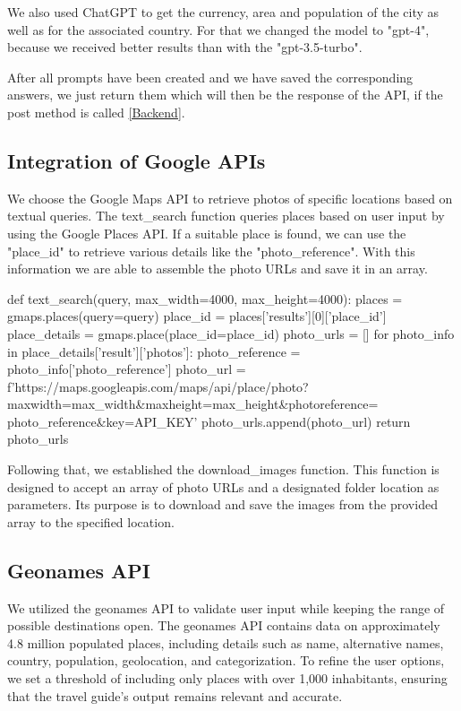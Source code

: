 \documentclass[english,notitlepage,smartquotes]{hgbreport}
\begin{document}
We also used ChatGPT to get the currency, area and population of the city as well as for the associated country. For that we changed the model to "gpt-4", because we received better results than with the "gpt-3.5-turbo".

After all prompts have been created and we have saved the corresponding answers, we just return them which will then be the response of the API, if the post method is called \ref{Backend}.

\subsection{Integration of Google APIs}
We choose the Google Maps API to retrieve photos of specific locations based on textual queries. The text\_search function queries places based on user input by using the Google Places API. If a suitable place is found, we can use the "place\_id" to retrieve various details like the "photo\_reference". With this information we are able to assemble the photo URLs and save it in an array.
\begin{PythonCode}
	def text_search(query, max_width=4000, max_height=4000):
	places = gmaps.places(query=query)
	place_id = places['results'][0]['place_id']
	place_details = gmaps.place(place_id=place_id)
	photo_urls = []
	for photo_info in place_details['result']['photos']:
	photo_reference = photo_info['photo_reference']
	photo_url = f'https://maps.googleapis.com/maps/api/place/photo?
	maxwidth={max_width}&maxheight={max_height}&photoreference={
		photo_reference}&key={API_KEY}'
	photo_urls.append(photo_url)
	return photo_urls
\end{PythonCode}
Following that, we established the download\_images function. This function is designed to accept an array of photo URLs and a designated folder location as parameters. Its purpose is to download and save the images from the provided array to the specified location.

\subsection{Geonames API} \label{GeonamesAPI}
We utilized the geonames API to validate user input while keeping the range of possible destinations open. The geonames API contains data on approximately 4.8 million populated places, including details such as name, alternative names, country, population, geolocation, and categorization. To refine the user options, we set a threshold of including only places with over 1,000 inhabitants, ensuring that the travel guide's output remains relevant and accurate.
\end{document}
